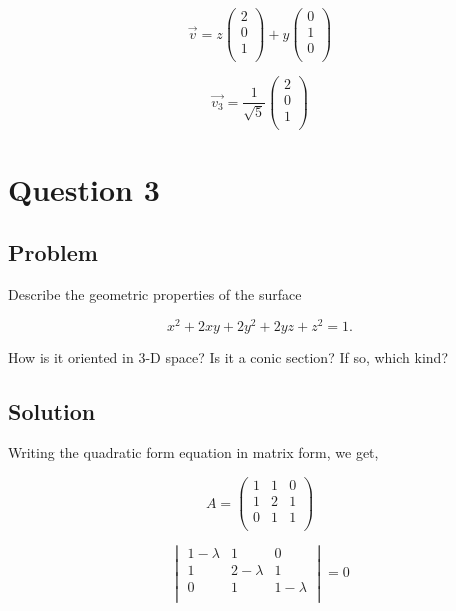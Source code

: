 \documentclass[12pt]{article}
\begin{document}
\[
    \vec{v} = z \begin{pmatrix}
        2 \\
        0 \\
        1 \\
    \end{pmatrix} +
    y \begin{pmatrix}
        0 \\
        1 \\
        0 \\
    \end{pmatrix}
\]

\[
    \vec{v_3} = \frac{1}{\sqrt{5}} \begin{pmatrix}
        2 \\
        0 \\
        1 \\
    \end{pmatrix}
\]

\newpage
\section{Question 3}

\subsection{Problem}

Describe the geometric properties of the surface

\[
    x^2+2 x y+2 y^2+2 y z+z^2=1 .
\]

How is it oriented in 3-D space? Is it a conic section? If so, which kind?

\subsection{Solution}

Writing the quadratic form equation in matrix form, we get,

\[
    A = \begin{pmatrix}
        1 & 1 & 0 \\
        1 & 2 & 1 \\
        0 & 1 & 1 \\
    \end{pmatrix}
\]

\[
    \begin{vmatrix}
        1 - \lambda & 1           & 0           \\
        1           & 2 - \lambda & 1           \\
        0           & 1           & 1 - \lambda \\
    \end{vmatrix} = 0
\]
\end{document}
